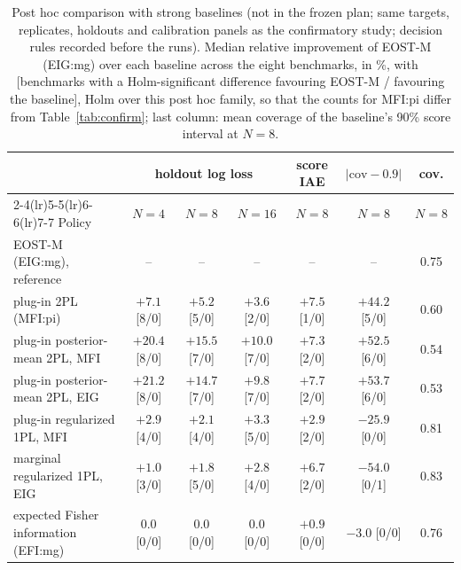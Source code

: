 \begin{table}[tbp]
\centering\footnotesize
\caption{Post hoc comparison with strong baselines (not in the frozen plan; same targets, replicates, holdouts and calibration panels as the confirmatory study; decision rules recorded before the runs). Median relative improvement of EOST-M (EIG:mg) over each baseline across the eight benchmarks, in \%, with [benchmarks with a Holm-significant difference favouring EOST-M / favouring the baseline], Holm over this post hoc family, so that the counts for MFI:pi differ from Table~\ref{tab:confirm}; last column: mean coverage of the baseline's 90\% score interval at $N=8$.}
\label{tab:posthoc}
\setlength{\tabcolsep}{2.3pt}
\begin{tabular}{@{}lcccccc@{}}
\toprule
 & \multicolumn{3}{c}{holdout log loss} & score IAE & $|\mathrm{cov}-0.9|$ & cov. \\
\cmidrule(lr){2-4}\cmidrule(lr){5-5}\cmidrule(lr){6-6}\cmidrule(lr){7-7}
Policy & $N=4$ & $N=8$ & $N=16$ & $N=8$ & $N=8$ & $N=8$ \\
\midrule
EOST-M (EIG:mg), reference & -- & -- & -- & -- & -- & 0.75 \\
\midrule
plug-in 2PL (MFI:pi) & $+7.1$ [8/0] & $+5.2$ [5/0] & $+3.6$ [2/0] & $+7.5$ [1/0] & $+44.2$ [5/0] & 0.60 \\
plug-in posterior-mean 2PL, MFI & $+20.4$ [8/0] & $+15.5$ [7/0] & $+10.0$ [7/0] & $+7.3$ [2/0] & $+52.5$ [6/0] & 0.54 \\
plug-in posterior-mean 2PL, EIG & $+21.2$ [8/0] & $+14.7$ [7/0] & $+9.8$ [7/0] & $+7.7$ [2/0] & $+53.7$ [6/0] & 0.53 \\
plug-in regularized 1PL, MFI & $+2.9$ [4/0] & $+2.1$ [4/0] & $+3.3$ [5/0] & $+2.9$ [2/0] & $-25.9$ [0/0] & 0.81 \\
marginal regularized 1PL, EIG & $+1.0$ [3/0] & $+1.8$ [5/0] & $+2.8$ [4/0] & $+6.7$ [2/0] & $-54.0$ [0/1] & 0.83 \\
expected Fisher information (EFI:mg) & $0.0$ [0/0] & $0.0$ [0/0] & $0.0$ [0/0] & $+0.9$ [0/0] & $-3.0$ [0/0] & 0.76 \\
\bottomrule
\end{tabular}
\end{table}
